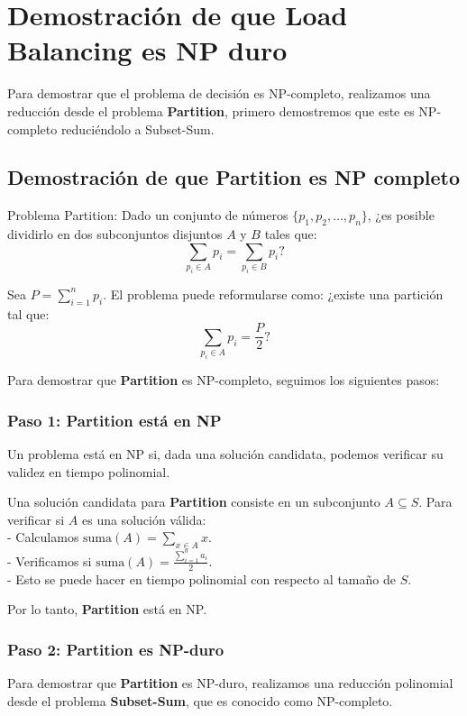 \documentclass{report}
\begin{document}
	\section{Demostración de que Load Balancing es NP duro}
	
		
	Para demostrar que el problema de decisión es NP-completo, realizamos una reducción desde el problema \textbf{Partition}, primero demostremos que este es NP-completo reduciéndolo a Subset-Sum.
	
	\subsection{Demostración de que Partition es NP completo}
	
	Problema Partition:	Dado un conjunto de números $ \{p_1, p_2, \dots, p_n\} $, ¿es posible dividirlo en dos subconjuntos disjuntos $ A $ y $ B $ tales que:
	\[
	\sum_{p_i \in A} p_i = \sum_{p_i \in B} p_i?
	\]
	
	Sea $ P = \sum_{i=1}^n p_i $. El problema puede reformularse como: ¿existe una partición tal que:
	\[
	\sum_{p_i \in A} p_i = \frac{P}{2}?
	\]
	
	
	Para demostrar que \textbf{Partition} es NP-completo, seguimos los siguientes pasos:
	
	\subsubsection*{Paso 1: Partition está en NP}
	
	Un problema está en NP si, dada una solución candidata, podemos verificar su validez en tiempo polinomial.
	
	Una solución candidata para \textbf{Partition} consiste en un subconjunto $ A \subseteq S $. Para verificar si $ A $ es una solución válida:\\
	- Calculamos $ \text{suma}(A) = \sum_{x \in A} x $.\\
	- Verificamos si $ \text{suma}(A) = \frac{\sum_{i=1}^n a_i}{2} $.\\
	- Esto se puede hacer en tiempo polinomial con respecto al tamaño de $ S $.
	
	Por lo tanto, \textbf{Partition} está en NP.
	
	\subsubsection*{Paso 2: Partition es NP-duro}
	
	Para demostrar que \textbf{Partition} es NP-duro, realizamos una reducción polinomial desde el problema \textbf{Subset-Sum}, que es conocido como NP-completo.
	
\end{document}
